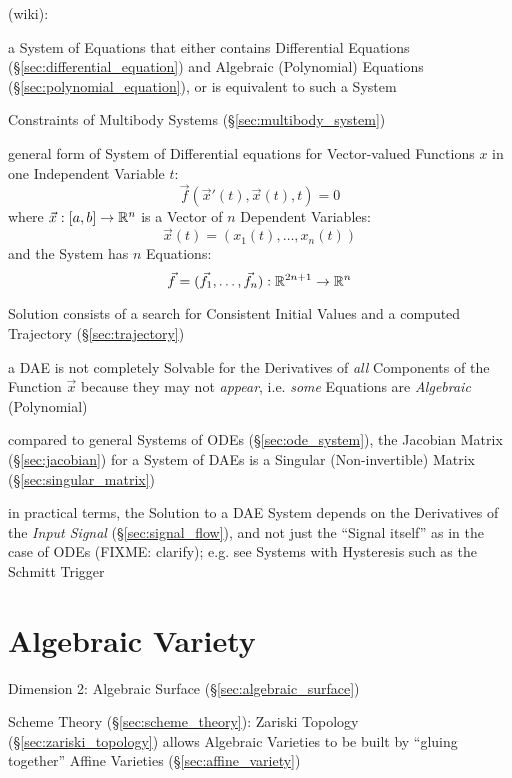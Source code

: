 (wiki):

a System of Equations that either contains Differential Equations
(\S\ref{sec:differential_equation}) and Algebraic (Polynomial) Equations
(\S\ref{sec:polynomial_equation}), or is equivalent to such a System

\fist Constraints of Multibody Systems (\S\ref{sec:multibody_system})

general form of System of Differential equations for Vector-valued Functions
$x$ in one Independent Variable $t$:
\[
  \vec{f}(\vec{x}'(t), \vec{x}(t), t) = 0
\]
where $\vec{x} : [a,b] \rightarrow \mathbb{R}^n$ is a Vector of $n$ Dependent
Variables:
\[
  \vec{x}(t) = (x_1(t), \ldots, x_n(t))
\]
and the System has $n$ Equations:
\[
  \vec{f} = (\vec{f}_1, \ldots, \vec{f}_n) : \mathbb{R}^{2n+1} \rightarrow \mathbb{R}^n
\]

Solution consists of a search for Consistent Initial Values and a computed
Trajectory (\S\ref{sec:trajectory})

a DAE is not completely Solvable for the Derivatives of \emph{all} Components
of the Function $\vec{x}$ because they may not \emph{appear}, i.e. \emph{some}
Equations are \emph{Algebraic} (Polynomial)

compared to general Systems of ODEs (\S\ref{sec:ode_system}), the Jacobian
Matrix (\S\ref{sec:jacobian}) for a System of DAEs is a Singular
(Non-invertible) Matrix (\S\ref{sec:singular_matrix})

in practical terms, the Solution to a DAE System depends on the Derivatives of
the \emph{Input Signal} (\S\ref{sec:signal_flow}), and not just the ``Signal
itself'' as in the case of ODEs
(FIXME: clarify); e.g. see Systems with Hysteresis such as the Schmitt Trigger



\section{Algebraic Variety}\label{sec:algebraic_variety}

Dimension 2: Algebraic Surface (\S\ref{sec:algebraic_surface})

Scheme Theory (\S\ref{sec:scheme_theory}): Zariski Topology
(\S\ref{sec:zariski_topology}) allows Algebraic Varieties to be built by
``gluing together'' Affine Varieties (\S\ref{sec:affine_variety})

